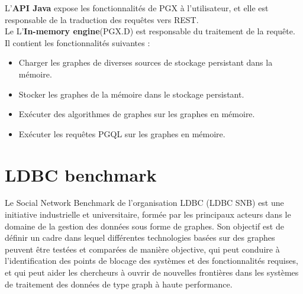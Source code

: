 L’\textbf{API Java} expose les fonctionnalités de PGX à l'utilisateur, et elle est responsable de la traduction des requêtes vers REST.\\
Le L’\textbf{In-memory engine}(PGX.D) est responsable du traitement de la requête. Il contient les fonctionnalités suivantes :
\begin{itemize}[label=\textbullet]
\item Charger les graphes de diverses sources de stockage persistant dans la mémoire.
\item Stocker les graphes de la mémoire dans le stockage persistant.
\item Exécuter des algorithmes de graphes sur les graphes en mémoire.
\item Exécuter les requêtes PGQL sur les graphes en mémoire.
\end{itemize}

\section{LDBC benchmark}
Le Social Network Benchmark de l’organisation LDBC (LDBC SNB) est une initiative industrielle et universitaire, formée par les principaux acteurs dans le domaine de la gestion des données sous forme de graphes. Son objectif est de définir un cadre dans lequel différentes technologies basées sur des graphes peuvent être testées et comparées de manière objective, qui peut conduire à l'identification des points de blocage des systèmes et des fonctionnalités requises, et qui peut aider les chercheurs à ouvrir de nouvelles frontières dans les systèmes de traitement des données de type graph à haute performance.


